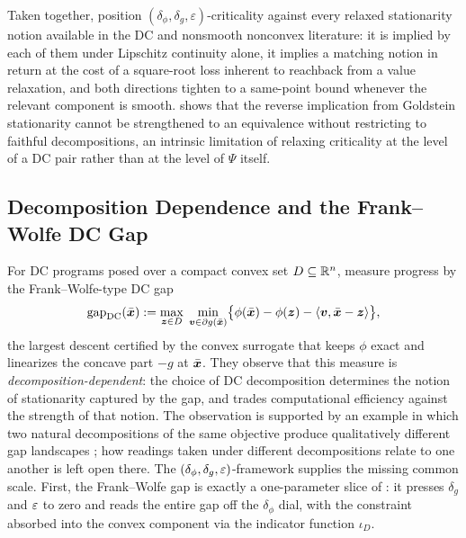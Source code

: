 Taken together,
position $(\delta_\phi,\delta_g,\varepsilon)$-criticality against every
relaxed stationarity notion available in the DC and nonsmooth nonconvex
literature: it is implied by each of them under Lipschitz continuity
alone, it implies a matching notion in return at the cost of a
square-root loss inherent to reachback from a value relaxation, and both
directions tighten to a same-point bound whenever the relevant component
is smooth.  shows that the reverse
implication from Goldstein stationarity cannot be strengthened to an
equivalence without restricting to faithful decompositions, an intrinsic
limitation of relaxing criticality at the level of a DC pair rather than
at the level of $\Psi$ itself.

\subsection{Decomposition Dependence and the Frank--Wolfe DC Gap}
\label{sec:decomposition-dependence}

For DC programs posed over a compact convex set $D\subseteq\mathbb{R}^n$,
\citet{maskan2025} measure progress by the Frank--Wolfe-type DC gap
\begin{equation}
    \operatorname{gap}_{\mathrm{DC}}(\bar{\bm{x}})
    :=\max_{\bm{z}\in D}\;\min_{\bm{v}\in\partial g(\bar{\bm{x}})}
    \bigl\{\phi(\bar{\bm{x}})-\phi(\bm{z})-\langle\bm{v},\bar{\bm{x}}-\bm{z}\rangle\bigr\},
    \label{eq:gap-dc}
\end{equation}
the largest descent certified by the convex surrogate that keeps $\phi$
exact and linearizes the concave part $-g$ at $\bar{\bm{x}}$. They observe
that this measure is \emph{decomposition-dependent}: the choice of DC
decomposition determines the notion of stationarity captured by the
gap, and trades computational efficiency against the strength of that
notion. The observation is supported by an example in which two natural
decompositions of the same objective produce qualitatively different
gap landscapes \citep[Figure~1]{maskan2025}; how readings taken under
different decompositions relate to one another is left open there. The
$(\delta_\phi,\delta_g,\varepsilon)$-framework supplies the missing common
scale. First, the Frank--Wolfe gap is exactly a one-parameter slice of
: it presses $\delta_g$ and $\varepsilon$ to zero
and reads the entire gap off the $\delta_\phi$ dial, with the
constraint absorbed into the convex component via the indicator
function $\iota_D$.


